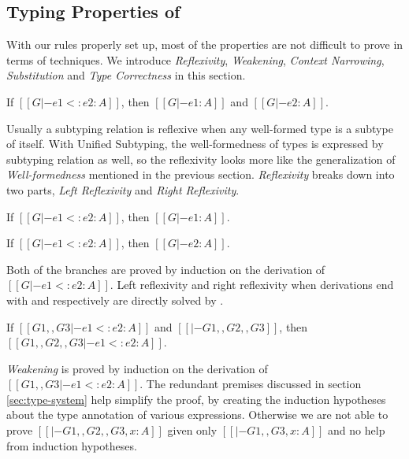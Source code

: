 \subsection{Typing Properties of \name}

With our rules properly set up, most of the properties are not difficult to
prove in terms of techniques. We introduce \emph{Reflexivity}, \emph{Weakening},
\emph{Context Narrowing}, \emph{Substitution} and \emph{Type Correctness}
in this section.

\begin{theorem}[Reflexivity]
   If $[[G |- e1 <: e2 : A]]$,
   then $[[G |- e1 : A]]$ and $[[G |- e2 : A]]$.
\end{theorem}

Usually a subtyping relation is reflexive when any well-formed type is a subtype
of itself. With Unified Subtyping, the well-formedness of types is expressed by
subtyping relation as well, so the reflexivity looks more like the generalization
of \emph{Well-formedness} mentioned in the previous section. \emph{Reflexivity}
breaks down into two parts, \emph{Left Reflexivity} and \emph{Right Reflexivity}.

\begin{lemma}
   If $[[G |- e1 <: e2 : A]]$,
   then $[[G |- e1 : A]]$.
\end{lemma}

\begin{lemma}
   If $[[G |- e1 <: e2 : A]]$,
   then $[[G |- e2 : A]]$.
\end{lemma}

Both of the branches are proved by induction on the derivation of
$[[G |- e1 <: e2 : A]]$.
Left reflexivity and right reflexivity when derivations end with 
and  respectively are directly solved by .

\begin{theorem}[Weakening]
    If $[[G1 ,, G3 |- e1 <: e2 : A]]$ and $[[|- G1 ,, G2 ,, G3]]$,
    then $[[G1 ,, G2 ,, G3 |- e1 <: e2 : A]]$.
\end{theorem}

\emph{Weakening} is proved by induction on the derivation of
$[[G1 ,, G3 |- e1 <: e2 : A]]$. The redundant premises discussed in section
\ref{sec:type-system} help simplify the proof, by creating the induction
hypotheses about the type annotation of various expressions. Otherwise we are
not able to prove $[[|- G1 ,, G2 ,, G3 , x : A]]$ given only
$[[|- G1 ,, G3 , x : A]]$ and no help from induction hypotheses.


